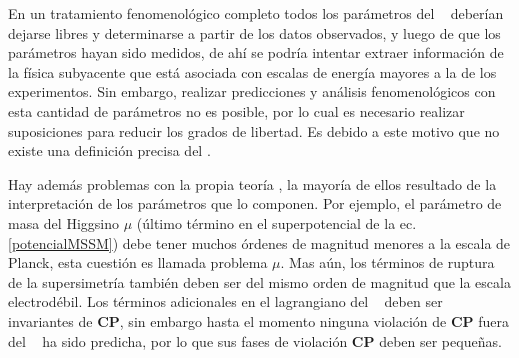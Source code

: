 
En un tratamiento fenomenológico completo todos los parámetros del \MSSM~ deberían dejarse libres y determinarse a partir de los datos observados, y luego de que los parámetros hayan sido medidos, de ahí se podría intentar extraer información de la física subyacente que está asociada con escalas de energía mayores a la de los experimentos. Sin embargo, realizar predicciones y análisis fenomenológicos con esta cantidad de parámetros no es posible, por lo cual es necesario realizar suposiciones para reducir los grados de libertad. Es debido a este motivo que no existe una definición precisa del \MSSM .%

Hay además problemas con la propia teoría \MSSM, la mayoría de ellos resultado de la interpretación de los parámetros que lo componen. Por ejemplo, el parámetro de masa del Higgsino $\mu$ (último término en el superpotencial de la ec. \ref{potencialMSSM}) debe tener %
muchos órdenes de magnitud menores a la escala de Planck, esta cuestión es llamada problema $\mu$. Mas aún, los términos de ruptura de la supersimetría también deben ser del mismo orden de magnitud que la escala electrodébil. Los términos adicionales en el lagrangiano del \MSSM ~ deben ser invariantes de \textbf{CP}, sin embargo hasta el momento ninguna violación de \textbf{CP} fuera del \ME ~ ha sido predicha, por lo que sus fases de violación \textbf{CP} deben ser pequeñas.


